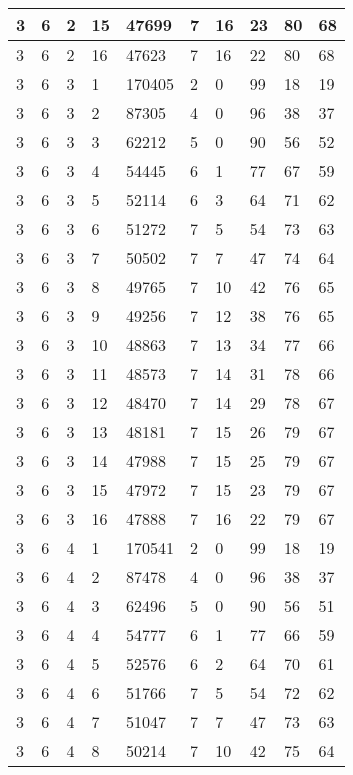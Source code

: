 \begin{table}[!ht]
\begin{tabular}{|l|l|l|l|l|l|l|l|l|l|}
        3 & 6 & 2 & 15 & 47699 & 7 & 16 & 23 & 80 & 68 \\ \hline
        3 & 6 & 2 & 16 & 47623 & 7 & 16 & 22 & 80 & 68 \\ \hline
        3 & 6 & 3 & 1 & 170405 & 2 & 0 & 99 & 18 & 19 \\ \hline
        3 & 6 & 3 & 2 & 87305 & 4 & 0 & 96 & 38 & 37 \\ \hline
        3 & 6 & 3 & 3 & 62212 & 5 & 0 & 90 & 56 & 52 \\ \hline
        3 & 6 & 3 & 4 & 54445 & 6 & 1 & 77 & 67 & 59 \\ \hline
        3 & 6 & 3 & 5 & 52114 & 6 & 3 & 64 & 71 & 62 \\ \hline
        3 & 6 & 3 & 6 & 51272 & 7 & 5 & 54 & 73 & 63 \\ \hline
        3 & 6 & 3 & 7 & 50502 & 7 & 7 & 47 & 74 & 64 \\ \hline
        3 & 6 & 3 & 8 & 49765 & 7 & 10 & 42 & 76 & 65 \\ \hline
        3 & 6 & 3 & 9 & 49256 & 7 & 12 & 38 & 76 & 65 \\ \hline
        3 & 6 & 3 & 10 & 48863 & 7 & 13 & 34 & 77 & 66 \\ \hline
        3 & 6 & 3 & 11 & 48573 & 7 & 14 & 31 & 78 & 66 \\ \hline
        3 & 6 & 3 & 12 & 48470 & 7 & 14 & 29 & 78 & 67 \\ \hline
        3 & 6 & 3 & 13 & 48181 & 7 & 15 & 26 & 79 & 67 \\ \hline
        3 & 6 & 3 & 14 & 47988 & 7 & 15 & 25 & 79 & 67 \\ \hline
        3 & 6 & 3 & 15 & 47972 & 7 & 15 & 23 & 79 & 67 \\ \hline
        3 & 6 & 3 & 16 & 47888 & 7 & 16 & 22 & 79 & 67 \\ \hline
        3 & 6 & 4 & 1 & 170541 & 2 & 0 & 99 & 18 & 19 \\ \hline
        3 & 6 & 4 & 2 & 87478 & 4 & 0 & 96 & 38 & 37 \\ \hline
        3 & 6 & 4 & 3 & 62496 & 5 & 0 & 90 & 56 & 51 \\ \hline
        3 & 6 & 4 & 4 & 54777 & 6 & 1 & 77 & 66 & 59 \\ \hline
        3 & 6 & 4 & 5 & 52576 & 6 & 2 & 64 & 70 & 61 \\ \hline
        3 & 6 & 4 & 6 & 51766 & 7 & 5 & 54 & 72 & 62 \\ \hline
        3 & 6 & 4 & 7 & 51047 & 7 & 7 & 47 & 73 & 63 \\ \hline
        3 & 6 & 4 & 8 & 50214 & 7 & 10 & 42 & 75 & 64 \\ \hline

\end{tabular}
\end{table}
